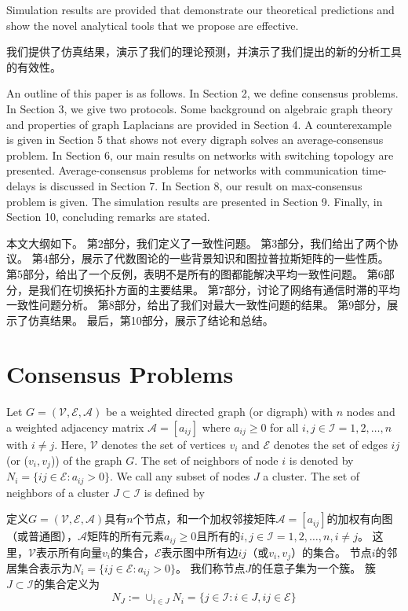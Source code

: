 \documentclass{article}
\begin{document}
{\color[gray]{0.5}
Simulation results are provided that demonstrate our theoretical predictions and show the novel analytical tools that we propose are eﬀective.
}

我们提供了仿真结果，演示了我们的理论预测，并演示了我们提出的新的分析工具的有效性。

{\color[gray]{0.5}
An outline of this paper is as follows. 
In Section 2, we deﬁne consensus problems. 
In Section 3, we give two protocols. 
Some background on algebraic graph theory and properties of graph Laplacians are provided in Section 4. 
A counterexample is given in Section 5 that shows not every digraph solves an average-consensus problem. 
In Section 6, our main results on networks with switching topology are presented. 
Average-consensus problems for networks with communication time-delays is discussed in Section 7. 
In Section 8, our result on max-consensus problem is given. 
The simulation results are presented in Section 9. 
Finally, in Section 10, concluding remarks are stated.
}

本文大纲如下。
第2部分，我们定义了一致性问题。
第3部分，我们给出了两个协议。
第4部分，展示了代数图论的一些背景知识和图拉普拉斯矩阵的一些性质。
第5部分，给出了一个反例，表明不是所有的图都能解决平均一致性问题。
第6部分，是我们在切换拓扑方面的主要结果。
第7部分，讨论了网络有通信时滞的平均一致性问题分析。
第8部分，给出了我们对最大一致性问题的结果。
第9部分，展示了仿真结果。
最后，第10部分，展示了结论和总结。

\section{Consensus Problems}
{\color[gray]{0.5}
Let $G=(\mathcal{V},\mathcal{E},\mathcal{A})$ be a weighted directed graph (or digraph) with $n$ nodes and a weighted adjacency matrix $\mathcal{A}=[a_{ij}]$ where $a_{ij} \ge 0$ for all $i,j \in \mathcal{I}={1,2,…,n}$ with $i \ne j$. 
Here, $\mathcal{V}$ denotes the set of vertices $v_i$ and $\mathcal{E}$ denotes the set of edges $ij$ (or ($v_i,v_j$)) of the graph $G$. 
The set of neighbors of node $i$ is denoted by $N_i=\{ij\in \mathcal{E}:a_{ij}>0\}$. 
We call any subset of nodes $J$ a cluster. 
The set of neighbors of a cluster $J\subset \mathcal{I}$ is deﬁned by
}

\noindent 定义$G=(\mathcal{V},\mathcal{E},\mathcal{A})$具有$n$个节点，和一个加权邻接矩阵$\mathcal{A}=[a_{ij}]$的加权有向图（或普通图），$\mathcal{A}$矩阵的所有元素$a_{ij} \ge 0$且所有的$i,j \in \mathcal{I}={1,2,…,n},i \ne j$。
这里，$\mathcal{V}$表示所有向量$v_i$的集合，$\mathcal{E}$表示图中所有边$ij$（或$v_i,v_j$）的集合。
节点$i$的邻居集合表示为$N_i=\{ij\in \mathcal{E}:a_{ij}>0\}$。
我们称节点$J$的任意子集为一个簇。
簇$J\subset \mathcal{I}$的集合定义为
\begin{equation}
    N_J:=\cup_{i\in J}N_i=\{j\in \mathcal{I}:i\in J, ij\in \mathcal{E}\}
    \tag{1}
    \label{1}
\end{equation}
\end{document}
